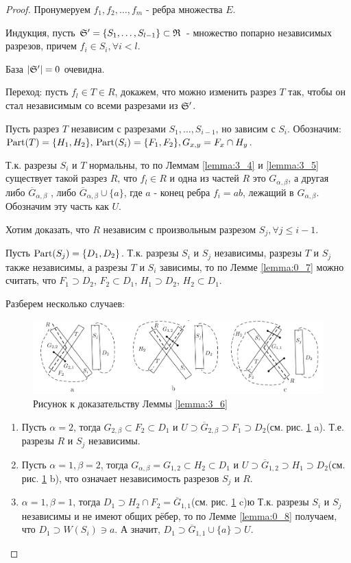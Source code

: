 \begin{proof}
	Пронумеруем $f_1, f_2, \ldots, f_m$ - ребра множества $E$.
	
	Индукция, пусть  $\S' = \{S_1, \ldots, S_{l - 1}\} \subset \R$ - множество попарно независимых разрезов, причем $f_i \in S_i, \forall i < l$.

	База $|\S'| = 0$ очевидна.

	Переход: пусть $f_l \in T \in R$, докажем, что можно изменить разрез  $T$ так, чтобы он стал независимым со всеми разрезами из  $\S'$.

	Пусть разрез  $T$ независим с разрезами  $S_1, \ldots, S_{i - 1}$, но зависим с $S_i$.
	Обозначим: $\Part(T) = \{H_1, H_2\}, \, \Part(S_i) = \{F_1, F_2\}, G_{x, y} = F_x \cap H_y$.

	Т.к. разрезы $S_i$ и  $T$ нормальны, то по Леммам \ref{lemma:3_4} и \ref{lemma:3_5} существует такой разрез  $R$, что  $f_l \in R$ и одна из частей  $R$ это  $G_{\alpha, \beta}$, а другая  либо  $\overline G_{\alpha, \beta}$ , либо  $\overline G_{\alpha, \beta} \cup \{a\}$, где $a$ - конец ребра  $f_i = ab$, лежащий в  $G_{\alpha, \beta}$.
	Обозначим эту часть как $U$.

	Хотим доказать, что $R$ независим с произвольным разрезом  $S_j, \forall j \leqslant i - 1$.

	Пусть $\Part(S_j) = \{D_1, D_2\}$. 
	Т.к. разрезы $S_i$ и  $S_j$ независимы, разрезы  $T$ и  $S_j$ также независимы, а разрезы  $T$ и  $S_i$ зависимы, то по Лемме \ref{lemma:0_7} можно считать, что $F_1 \supset D_2$, $F_2 \subset D_1$, $H_1 \supset D_2$, $H_2 \subset D_1$.

	Разберем несколько случаев:

\begin{figure}[ht]
    \centering
	\label{fig:3_lemma_6}
	\includegraphics[width=0.7\columnwidth]{figures/3_lemma_6.png}
	\caption{Рисунок к доказательству Леммы \ref{lemma:3_6}}
\end{figure}

	\begin{enumerate}
		\item Пусть $\alpha = 2$, тогда  $G_{2, \beta} \subset F_2 \subset D_1$ и $U \supset \overline G_{2, \beta} \supset F_1 \supset D_2$(см. рис. \ref{fig:3_lemma_6} a).
			Т.е. разрезы $R$ и  $S_j$ независимы.
		\item  Пусть $\alpha = 1, \beta = 2$, тогда $G_{\alpha, \beta} = G_{1, 2} \subset H_2 \subset D_1$ и $U \supset \overline G_{1, 2} \supset H_1 \supset D_2$(см. рис. \ref{fig:3_lemma_6} b), что означает независимость разрезов $S_j$ и  $R$.
		\item  $\alpha = 1, \beta = 1$, тогда $D_1 \supset H_2 \cap F_2 = \overline G_{1, 1}$(см. рис. \ref{fig:3_lemma_6} c)ю
			Т.к. разрезы $S_i$ и  $S_j$ независимы и не имеют общих рёбер, то по Лемме \ref{lemma:0_8} получаем, что  $D_1 \supset W(S_i) \ni a$.
			А значит, $D_1 \supset \overline G_{1, 1} \cup \{a\} \supset U$.


\end{enumerate}
\end{proof}
